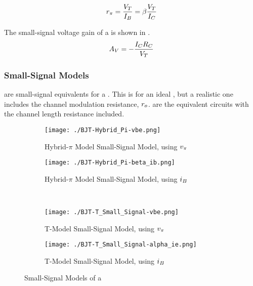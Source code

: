 \begin{equation}\label{eq:BJT-Pi_Resistance}
  r_{\pi} = \frac{\ThermalVoltage}{\DCCurrent{\Base}} = \beta \frac{\ThermalVoltage}{\DCCurrent{C}}
\end{equation}

The small-signal voltage gain of a  is shown in .
\begin{equation}\label{eq:BJT-Small_Signal_Voltage_Gain}
  \Amp{V} = - \frac{\DCCurrent{\Collector} R_{\Collector}}{\ThermalVoltage}
\end{equation}

\subsubsection{Small-Signal Models}\label{subsubsec:BJT-Small_Signal_Models}
 are small-signal equivalents for a .
This is for an ideal , but a realistic one includes the channel modulation resistance, $r_{o}$.
 are the equivalent circuits with the channel length resistance included.

\begin{figure}[h!tbp]
  \centering
  \begin{subfigure}{0.45\linewidth}
    \centering
    \texttt{[image: ./BJT-Hybrid\_Pi-vbe.png]}
    \caption{Hybrid-$\pi$ Model Small-Signal Model, using $\ACVoltage{\pi}$\\\parencite[p.~407]{sedraTextbook7}}
    \label{fig:BJT-Hybrid_Pi_Model-vbe}
  \end{subfigure}
  \begin{subfigure}{0.45\linewidth}
    \centering
    \texttt{[image: ./BJT-Hybrid\_Pi-beta\_ib.png]}
    \caption{Hybrid-$\pi$ Model Small-Signal Model, using $\ACCurrent{\Base}$\\\parencite[p.~407]{sedraTextbook7}}
    \label{fig:BJT-Hybrid_Pi_Model-ib}
  \end{subfigure}
  \\
  \begin{subfigure}{0.45\linewidth}
    \centering
    \texttt{[image: ./BJT-T\_Small\_Signal-vbe.png]}
    \caption{T-Model Small-Signal Model, using $\ACVoltage{\pi}$\\\parencite[p.~409]{sedraTextbook7}}
    \label{fig:BJT-T_Model-vbe}
  \end{subfigure}
  \begin{subfigure}{0.45\linewidth}
    \centering
    \texttt{[image: ./BJT-T\_Small\_Signal-alpha\_ie.png]}
    \caption{T-Model Small-Signal Model, using $\ACCurrent{\Base}$\\\parencite[p.~409]{sedraTextbook7}}
    \label{fig:BJT-T_Model-ib}
  \end{subfigure}
  \caption{Small-Signal Models of a }
  \label{fig:BJT-Small_Signal_Models}
\end{figure}

